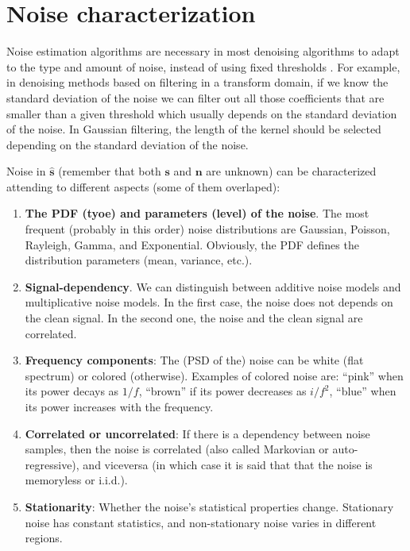 

\section{Noise characterization}

Noise estimation algorithms are necessary in most denoising algorithms
to adapt to the type and amount of noise, instead of using fixed
thresholds \cite{immerkaer1996fast}. For example, in denoising methods
based on filtering in a transform domain, if we know the standard
deviation of the noise we can filter out all those coefficients that
are smaller than a given threshold which usually depends on the
standard deviation of the noise. In Gaussian filtering, the length of
the kernel should be selected depending on the standard deviation of
the noise.

Noise in $\hat{\mathbf{s}}$ (remember that both $\mathbf{s}$ and
$\mathbf{n}$ are unknown) can be characterized attending to different
aspects (some of them overlaped):
\begin{enumerate}
\item \textbf{The \gls{PDF} (tyoe) and parameters (level) of the
    noise}. The most frequent (probably in this order) noise
  distributions are Gaussian, Poisson, Rayleigh, Gamma, and
  Exponential. Obviously, the \gls{PDF} defines the distribution
  parameters (mean, variance, etc.).
\item \textbf{Signal-dependency}. We can distinguish between additive
  noise models and multiplicative noise models. In the first case, the
  noise does not depends on the clean signal. In the second one, the
  noise and the clean signal are correlated.
\item \textbf{Frequency components}: The (\gls{PSD} of the) noise can
  be white (flat spectrum) or colored (otherwise). Examples of colored
  noise are: ``pink'' when its power decays as $1/f$, ``brown'' if its
  power decreases as $i/f^2$, ``blue'' when its power increases with
  the frequency.
\item \textbf{Correlated or uncorrelated}: If there is a dependency
  between noise samples, then the noise is correlated (also called Markovian or
  auto-regressive), and viceversa (in which case it is said that that
  the noise is memoryless or i.i.d.).
\item \textbf{Stationarity}: Whether the noise’s statistical
  properties change. Stationary noise has constant statistics, and
  non-stationary noise varies in different regions.
\end{enumerate}

